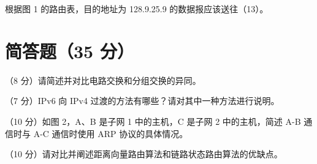 \begin{question}[index=9]
根据图 1 的路由表，目的地址为 128.9.25.9 的数据报应该送往（13）\underline{\hspace{6em}}。
\par\smallskip\noindent{}
\par\noindent{}
\end{question}
\section{简答题（35 分）}
\begin{question}[index=1]
（8 分）请简述并对比电路交换和分组交换的异同。
\end{question}
\begin{question}[index=2]
（7 分）IPv6 向 IPv4 过渡的方法有哪些？请对其中一种方法进行说明。
\end{question}
\begin{question}[index=3]
（10 分）如图 2，A、B 是子网 1 中的主机，C 是子网 2 中的主机，简述 A-B 通信时与 A-C 通信时使用 ARP 协议的具体情况。
\par\noindent\makebox[\linewidth][c]{}
\par\noindent{}
\end{question}
\begin{question}[index=4]
（10 分）请对比并阐述距离向量路由算法和链路状态路由算法的优缺点。
\end{question}
